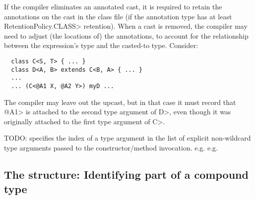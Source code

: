 \documentclass[10pt]{article}
\newcommand{\preverbnegspace}{\vspace{-5pt}}
\begin{document}
If the compiler eliminates an annotated cast, it is required to retain the
annotations on the cast in the class file (if the annotation type has at
least \<RetentionPolicy.CLASS> retention).  When a cast is removed, the
compiler may need to adjust (the locations of) the annotations, to account
for the relationship between the expression's type and the casted-to type.
Consider:

\preverbnegspace
\begin{Verbatim}
  class C<S, T> { ... }
  class D<A, B> extends C<B, A> { ... }
  ...
  ... (C<@A1 X, @A2 Y>) myD ...
\end{Verbatim}

\noindent
The compiler may leave out the upcast, but in that case it must record that
\<@A1> is attached to the second type argument of \<D>, even though it was
originally attached to the first type argument of \<C>.





TODO:  specifies the index of a type argument in the list
       of explicit non-wildcard type arguments passed to the
       constructor/method invocation.
       e.g. 
       e.g. 



\subsection{The  structure:  Identifying part of a compound type\label{class-file:ext:type_path}}

\newcommand{\tpath}[2]{\codefootnotesize{path\_length: #1; path: [#2]}}
\newcommand{\tarray}{\codefootnotesize{ARRAY(0, 0)}}
\newcommand{\tinner}{\codefootnotesize{INNER\_TYPE(1, 0)}}
\newcommand{\twildcard}{\codefootnotesize{WILDCARD(2, 0)}}
\newcommand{\ttypearg}[1]{\codefootnotesize{TYPE\_ARGUMENT(3, #1)}}

\end{document}
